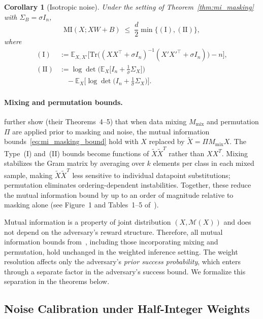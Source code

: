 \documentclass[letterpaper]{article} %
\newtheorem{corollary}[theorem]{Corollary}
\newcommand{\MI}{\mathrm{MI}}
\begin{document}
\begin{corollary}[Isotropic noise]
\label{cor:thm2_isotropic}
Under the setting of Theorem~\ref{thm:mi_masking} with $\Sigma_B = \sigma I_n$,
\begin{equation*}
\MI(X; XW + B) \;\le\; \frac{d}{2} \min \{ \mathrm{(I)}, \mathrm{(II)} \},
\end{equation*}
where
\begin{align*}
\mathrm{(I)} &:= \mathbb{E}_{X,X'}\!\bigl[
\mathrm{Tr}\bigl(
(XX^\top {+} \sigma I_n)^{-1}(X'X'^\top {+} \sigma I_n)
\bigr) - n
\bigr], \\
\mathrm{(II)} &:= \log \det\!\bigl(
\mathbb{E}_X\bigl[
I_n + \tfrac{1}{\sigma}\Sigma_X
\bigr]
\bigr) \\
&\quad - \mathbb{E}_X\bigl[
\log \det\bigl(
I_n + \tfrac{1}{\sigma}\Sigma_X
\bigr)
\bigr].
\end{align*}
\end{corollary}

\paragraph{Mixing and permutation bounds.}
\cite{xiao2024formal} further show (their Theorems~4--5) that when data mixing $M_{\mathrm{mix}}$ and permutation $\Pi$ are applied prior to masking and noise, the mutual information bounds~\eqref{eq:mi_masking_bound} hold with $X$ replaced by $\tilde{X} = \Pi M_{\mathrm{mix}} X$. The Type~(I) and~(II) bounds become functions of $\tilde{X}\tilde{X}^T$ rather than $XX^T$. Mixing stabilizes the Gram matrix by averaging over $k$ elements per class in each mixed sample, making $\tilde{X}\tilde{X}^T$ less sensitive to individual datapoint substitutions; permutation eliminates ordering-dependent instabilities. Together, these reduce the mutual information bound by up to an order of magnitude relative to masking alone (see Figure~1 and Tables~1--5 of~\cite{xiao2024formal}).

Mutual information is a property of joint distribution $(X, \mathcal{M}(X))$ and does not depend on the adversary's reward structure. Therefore, all mutual information bounds from~\cite{xiao2024formal}, including those incorporating mixing and permutation, hold unchanged in the weighted inference setting. The weight resolution affects only the adversary's \emph{prior success probability}, which enters through a separate factor in the adversary's success bound. We formalize this separation in the theorems below.

\subsection{Noise Calibration under Half-Integer Weights}
\end{document}
